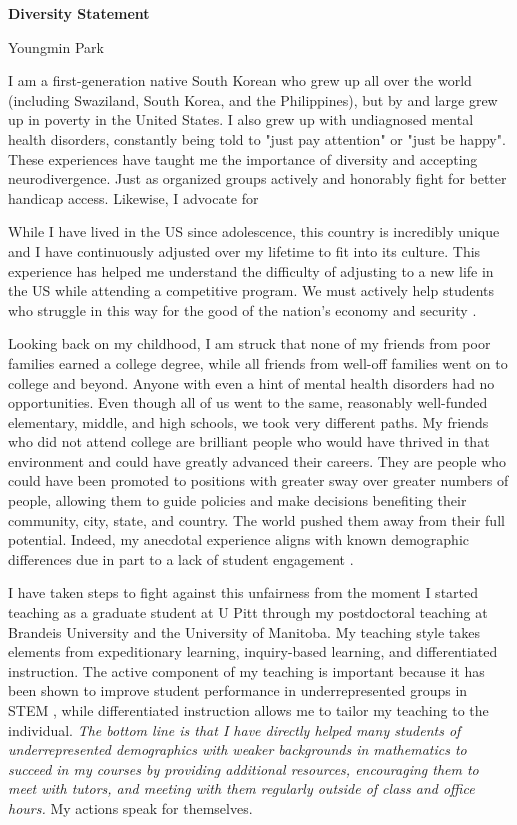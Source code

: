 \documentclass[a4paper,11pt]{article}
\begin{document}
	
	\begin{center}
		\Large \textbf{Diversity Statement}
		
		\Large Youngmin Park
	\end{center}
	
	I am a first-generation native South Korean who grew up all over the world (including Swaziland, South Korea, and the Philippines), but by and large grew up in poverty in the United States. I also grew up with undiagnosed mental health disorders, constantly being told to "just pay attention" or "just be happy". These experiences have taught me the importance of diversity and accepting neurodivergence. Just as organized groups actively and honorably fight for better handicap access. Likewise, I advocate for 
	
	While I have lived in the US since adolescence, this country is incredibly unique and I have continuously adjusted over my lifetime to fit into its culture. This experience has helped me understand the difficulty of adjusting to a new life in the US while attending a competitive program. We must actively help students who struggle in this way for the good of the nation's economy and security \cite{jones2018call}.
	
	Looking back on my childhood, I am struck that none of my friends from poor families earned a college degree, while all friends from well-off families went on to college and beyond. Anyone with even a hint of mental health disorders had no opportunities. Even though all of us went to the same, reasonably well-funded elementary, middle, and high schools, we took very different paths. My friends who did not attend college are brilliant people who would have thrived in that environment and could have greatly advanced their careers. They are people who could have been promoted to positions with greater sway over greater numbers of people, allowing them to guide policies and make decisions benefiting their community, city, state, and country. The world pushed them away from their full potential. Indeed, my anecdotal experience aligns with known demographic differences \cite{jones2018call} due in part to a lack of student engagement \cite{kokkelenberg2010succeeds,savaria2017critical}.
	
	I have taken steps to fight against this unfairness from the moment I started teaching as a graduate student at U Pitt through my postdoctoral teaching at Brandeis University and the University of Manitoba. My teaching style takes elements from expeditionary learning, inquiry-based learning, and differentiated instruction. The active component of my teaching is important because it has been shown to improve student performance in underrepresented groups in STEM \cite{theobald2020active}, while differentiated instruction allows me to tailor my teaching to the individual. \textit{The bottom line is that I have directly helped many students of underrepresented demographics with weaker backgrounds in mathematics to succeed in my courses by providing additional resources, encouraging them to meet with tutors, and meeting with them regularly outside of class and office hours.} My actions speak for themselves.
	
\end{document}

